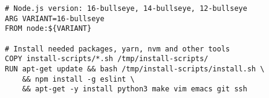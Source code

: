 
\begin{lstlisting}[language=docker, frame=single, caption={NodeJS DevContainer Dockerfile},label=code::docker_dev_node]
# Node.js version: 16-bullseye, 14-bullseye, 12-bullseye
ARG VARIANT=16-bullseye
FROM node:${VARIANT}

# Install needed packages, yarn, nvm and other tools
COPY install-scripts/*.sh /tmp/install-scripts/
RUN apt-get update && bash /tmp/install-scripts/install.sh \
    && npm install -g eslint \
    && apt-get -y install python3 make vim emacs git ssh
\end{lstlisting}
